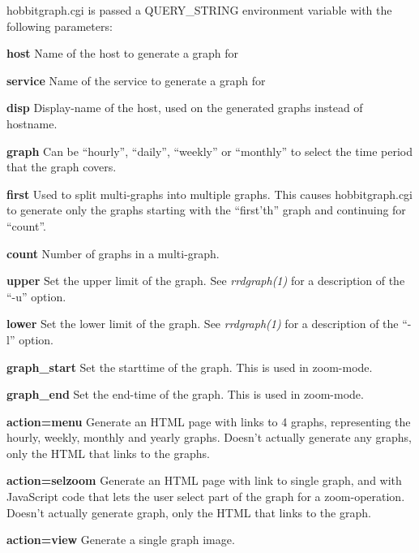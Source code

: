   hobbitgraph.cgi is passed a QUERY\_STRING environment variable with the following parameters: 


 \textbf{host}
 Name of the host to generate a graph for 


 \textbf{service}
 Name of the service to generate a graph for 


 \textbf{disp}
 Display-name of the host, used on the generated graphs instead of hostname. 


 \textbf{graph}
 Can be ``hourly'', ``daily'', ``weekly'' or ``monthly'' to select the time period that the graph covers. 


 \textbf{first}
 Used to split multi-graphs into multiple graphs. This causes
 hobbitgraph.cgi to generate only the graphs starting with the
 ``first'th'' graph and continuing for ``count''. 


 \textbf{count}
 Number of graphs in a multi-graph. 


 \textbf{upper}
 Set the upper limit of the graph. See \emph{rrdgraph(1)}
 for a description of the ``-u'' option. 


 \textbf{lower}
 Set the lower limit of the graph. See \emph{rrdgraph(1)}
 for a description of the ``-l'' option. 


 \textbf{graph\_start}
 Set the starttime of the graph. This is used in zoom-mode. 


 \textbf{graph\_end}
 Set the end-time of the graph. This is used in zoom-mode. 


 \textbf{action=menu}
 Generate an HTML page with links to 4 graphs, representing the hourly, weekly, monthly and yearly graphs. Doesn't actually generate any graphs, only the HTML that links to the graphs. 


 \textbf{action=selzoom}
 Generate an HTML page with link to single graph, and with JavaScript code that lets the user select part of the graph for a zoom-operation. Doesn't actually generate graph, only the HTML that links to the graph. 


 \textbf{action=view}
 Generate a single graph image. 


 
